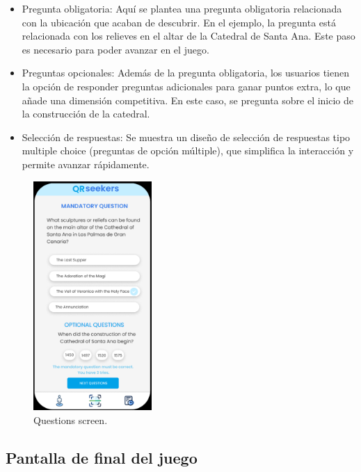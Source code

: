 \documentclass[letterpaper, 12pt]{report}
\begin{document}
\begin{itemize}
    \item Pregunta obligatoria: Aquí se plantea una pregunta obligatoria relacionada con la ubicación que acaban de descubrir. En el ejemplo, la pregunta está relacionada con los relieves en el altar de la Catedral de Santa Ana. Este paso es necesario para poder avanzar en el juego.
    \item Preguntas opcionales: Además de la pregunta obligatoria, los usuarios tienen la opción de responder preguntas adicionales para ganar puntos extra, lo que añade una dimensión competitiva. En este caso, se pregunta sobre el inicio de la construcción de la catedral.
    \item Selección de respuestas: Se muestra un diseño de selección de respuestas tipo multiple choice (preguntas de opción múltiple), que simplifica la interacción y permite avanzar rápidamente.
\end{itemize}

\begin{figure}[H]
\centering
\includegraphics[width=0.4\textwidth]{figure10.png}
\caption{Questions screen.}
\label{fig:1}
\end{figure}

\subsection{Pantalla de final del juego}
\end{document}
